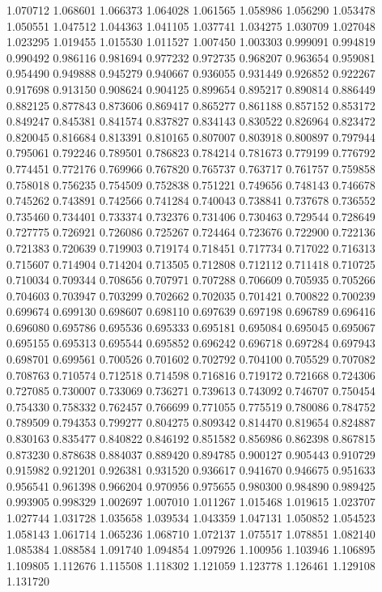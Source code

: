 1.070712
1.068601
1.066373
1.064028
1.061565
1.058986
1.056290
1.053478
1.050551
1.047512
1.044363
1.041105
1.037741
1.034275
1.030709
1.027048
1.023295
1.019455
1.015530
1.011527
1.007450
1.003303
0.999091
0.994819
0.990492
0.986116
0.981694
0.977232
0.972735
0.968207
0.963654
0.959081
0.954490
0.949888
0.945279
0.940667
0.936055
0.931449
0.926852
0.922267
0.917698
0.913150
0.908624
0.904125
0.899654
0.895217
0.890814
0.886449
0.882125
0.877843
0.873606
0.869417
0.865277
0.861188
0.857152
0.853172
0.849247
0.845381
0.841574
0.837827
0.834143
0.830522
0.826964
0.823472
0.820045
0.816684
0.813391
0.810165
0.807007
0.803918
0.800897
0.797944
0.795061
0.792246
0.789501
0.786823
0.784214
0.781673
0.779199
0.776792
0.774451
0.772176
0.769966
0.767820
0.765737
0.763717
0.761757
0.759858
0.758018
0.756235
0.754509
0.752838
0.751221
0.749656
0.748143
0.746678
0.745262
0.743891
0.742566
0.741284
0.740043
0.738841
0.737678
0.736552
0.735460
0.734401
0.733374
0.732376
0.731406
0.730463
0.729544
0.728649
0.727775
0.726921
0.726086
0.725267
0.724464
0.723676
0.722900
0.722136
0.721383
0.720639
0.719903
0.719174
0.718451
0.717734
0.717022
0.716313
0.715607
0.714904
0.714204
0.713505
0.712808
0.712112
0.711418
0.710725
0.710034
0.709344
0.708656
0.707971
0.707288
0.706609
0.705935
0.705266
0.704603
0.703947
0.703299
0.702662
0.702035
0.701421
0.700822
0.700239
0.699674
0.699130
0.698607
0.698110
0.697639
0.697198
0.696789
0.696416
0.696080
0.695786
0.695536
0.695333
0.695181
0.695084
0.695045
0.695067
0.695155
0.695313
0.695544
0.695852
0.696242
0.696718
0.697284
0.697943
0.698701
0.699561
0.700526
0.701602
0.702792
0.704100
0.705529
0.707082
0.708763
0.710574
0.712518
0.714598
0.716816
0.719172
0.721668
0.724306
0.727085
0.730007
0.733069
0.736271
0.739613
0.743092
0.746707
0.750454
0.754330
0.758332
0.762457
0.766699
0.771055
0.775519
0.780086
0.784752
0.789509
0.794353
0.799277
0.804275
0.809342
0.814470
0.819654
0.824887
0.830163
0.835477
0.840822
0.846192
0.851582
0.856986
0.862398
0.867815
0.873230
0.878638
0.884037
0.889420
0.894785
0.900127
0.905443
0.910729
0.915982
0.921201
0.926381
0.931520
0.936617
0.941670
0.946675
0.951633
0.956541
0.961398
0.966204
0.970956
0.975655
0.980300
0.984890
0.989425
0.993905
0.998329
1.002697
1.007010
1.011267
1.015468
1.019615
1.023707
1.027744
1.031728
1.035658
1.039534
1.043359
1.047131
1.050852
1.054523
1.058143
1.061714
1.065236
1.068710
1.072137
1.075517
1.078851
1.082140
1.085384
1.088584
1.091740
1.094854
1.097926
1.100956
1.103946
1.106895
1.109805
1.112676
1.115508
1.118302
1.121059
1.123778
1.126461
1.129108
1.131720
